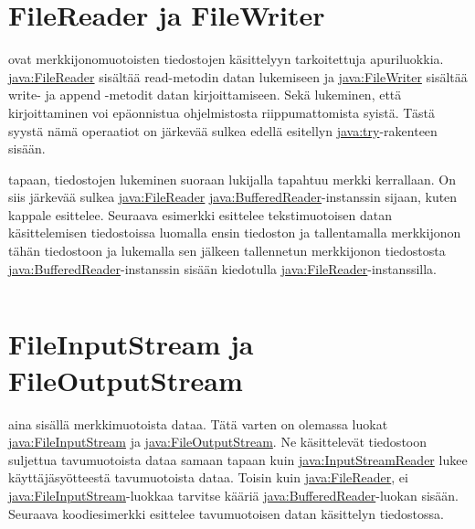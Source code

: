 \documentclass{tufte-book}
\newcommand{\java}[1]{\underline{\gls{java:#1}}}
\newcommand{\code}[3]{
\begin{listing}
    \inputminted{java}{OhjelmointiopasEsimerkit/src/#1/#2.java}
    \caption{#3}
    \label{Java-#1-#2}
\end{listing}
}
\begin{document}
\code{week4}{BasicTryCatchFinally}{\java{try}-, \java{catch}- ja \java{finally}-avainsanojen
käyttäminen}


\section{FileReader ja FileWriter}
\label{tiedostoapureista}

\newthought{\java{FileReader} ja \java{FileWriter}} ovat merkkijonomuotoisten tiedostojen
käsittelyyn tarkoitettuja apuriluokkia. \java{FileReader} sisältää read-metodin datan lukemiseen
ja \java{FileWriter} sisältää write- ja append -metodit datan kirjoittamiseen. Sekä lukeminen,
että kirjoittaminen voi epäonnistua ohjelmistosta riippumattomista syistä. Tästä syystä nämä
operaatiot on järkevää sulkea edellä esitellyn \java{try}-rakenteen sisään. 

 tapaan, tiedostojen lukeminen suoraan lukijalla tapahtuu merkki
kerrallaan. On siis järkevää sulkea \java{FileReader} \java{BufferedReader}-instanssin sijaan,
kuten kappale  esittelee. Seuraava esimerkki esittelee tekstimuotoisen datan
käsittelemisen tiedostoissa luomalla ensin tiedoston ja tallentamalla merkkijonon tähän tiedostoon
ja lukemalla sen jälkeen tallennetun merkkijonon tiedostosta \java{BufferedReader}-instanssin
sisään kiedotulla \java{FileReader}-instanssilla.

\code{week4}{BasicFileWriterReader}{Merkkijonodatan käsittely tiedostoissa}


\section{FileInputStream ja FileOutputStream}
\label{tiedostostreameista}

 aina sisällä merkkimuotoista dataa. Tätä varten on olemassa luokat
\java{FileInputStream} ja \java{FileOutputStream}. Ne käsittelevät tiedostoon suljettua
tavumuotoista dataa samaan tapaan kuin \java{InputStreamReader} lukee käyttäjäsyötteestä
tavumuotoista dataa. Toisin kuin \java{FileReader}, ei \java{FileInputStream}-luokkaa tarvitse
kääriä \java{BufferedReader}-luokan sisään. Seuraava koodiesimerkki esittelee tavumuotoisen datan
käsittelyn tiedostossa.
\end{document}
